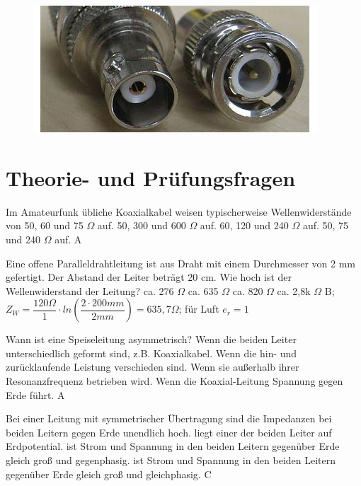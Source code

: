 \begin{figure}
 \vspace{-6cm}
  \includegraphics[scale=0.4]{KabelLeitungen/Bilder/bnc.jpg}
 \vspace{-6cm}
\end{figure}

\section*{Theorie- und Prüfungsfragen}



{Im Amateurfunk übliche Koaxialkabel weisen typischerweise Wellenwiderstände von}%
{50, 60 und 75 $\Omega$ auf.}%
{50, 300 und 600 $\Omega$ auf.}%
{60, 120 und 240 $\Omega$ auf.}%
{50, 75 und 240 $\Omega$ auf.}%
{A}%

{Eine offene Paralleldrahtleitung ist aus Draht mit einem Durchmesser von 2 mm gefertigt. Der Abstand der Leiter beträgt 20 cm. Wie hoch ist der Wellenwiderstand der Leitung?}%
{ca. 276 $\Omega$}%
{ca. 635 $\Omega$}%
{ca. 820 $\Omega$}%
{ca. 2,8k $\Omega$}%
{B; $Z_W = \dfrac{120\Omega}{1} \cdot ln \left( \dfrac{2\cdot 200mm}{2mm} \right) = 635,7\Omega$; für Luft $e_r=1$}%

{Wann ist eine Speiseleitung asymmetrisch?}%
{Wenn die beiden Leiter unterschiedlich geformt sind, z.B. Koaxialkabel.}%
{Wenn die hin- und zurücklaufende Leistung verschieden sind.}%
{Wenn sie außerhalb ihrer Resonanzfrequenz betrieben wird.}%
{Wenn die Koaxial-Leitung Spannung gegen Erde führt.}%
{A}%

{Bei einer Leitung mit symmetrischer Übertragung}%
{sind die Impedanzen bei beiden Leitern gegen Erde unendlich hoch.}%
{liegt einer der beiden Leiter auf Erdpotential.}%
{ist Strom und Spannung in den beiden Leitern gegenüber Erde gleich groß und gegenphasig.}%
{ist Strom und Spannung in den beiden Leitern gegenüber Erde gleich groß und gleichphasig.}%
{C}%

